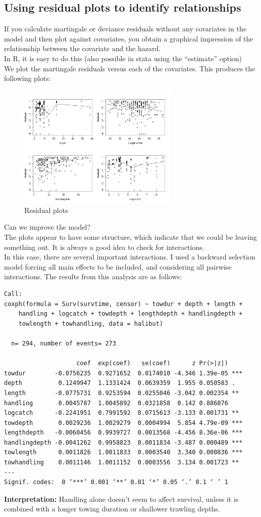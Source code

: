 \documentclass[11pt]{book}
\begin{document}
\subsection{Using residual plots to identify relationships}
If you calculate martingale or deviance residuals
without any covariates in the model and then plot
against covariates, you obtain a graphical impression of the
relationship between the covariate and the hazard.
\\[2ex]
In R, it is easy to do this (also possible in stata using the
``estimate'' option)
\\[2ex]
We plot the martingale residuals versus each of the covariates. This produces the following plots:
\begin{figure}[ht!]
\caption{Residual plots}
\centerline{\includegraphics[width=3in]{res_plots.pdf}}
\end{figure}
Can we improve the model?
\\[2ex]
The plots appear to have some structure, which indicate that
we could be leaving something out.  It is always a good idea
to check for interactions.
\\[2ex]
In this case, there are several important interactions.
I used a backward selection model forcing all main effects to be included,
and considering all pairwise interactions.
\newpage
\noindent
The results from this analysis are as follows:
\small
\begin{verbatim}
Call:
coxph(formula = Surv(survtime, censor) ~ towdur + depth + length +
    handling + logcatch + towdepth + lengthdepth + handlingdepth +
    towlength + towhandling, data = halibut)

  n= 294, number of events= 273

                    coef  exp(coef)   se(coef)      z Pr(>|z|)
towdur        -0.0756235  0.9271652  0.0174010 -4.346 1.39e-05 ***
depth          0.1249947  1.1331424  0.0639359  1.955 0.050583 .
length        -0.0775731  0.9253594  0.0255046 -3.042 0.002354 **
handling       0.0045787  1.0045892  0.0321858  0.142 0.886876
logcatch      -0.2241951  0.7991592  0.0715613 -3.133 0.001731 **
towdepth       0.0029236  1.0029279  0.0004994  5.854 4.79e-09 ***
lengthdepth   -0.0060456  0.9939727  0.0013568 -4.456 8.36e-06 ***
handlingdepth -0.0041262  0.9958823  0.0011834 -3.487 0.000489 ***
towlength      0.0011826  1.0011833  0.0003540  3.340 0.000836 ***
towhandling    0.0011146  1.0011152  0.0003556  3.134 0.001723 **
---
Signif. codes:  0 ‘***’ 0.001 ‘**’ 0.01 ‘*’ 0.05 ‘.’ 0.1 ‘ ’ 1

\end{verbatim}
\noindent
\normalsize
{\bf Interpretation:}
Handling alone doesn't seem to affect survival, unless it is combined
with a longer towing duration or shallower trawling depths.
\end{document}
